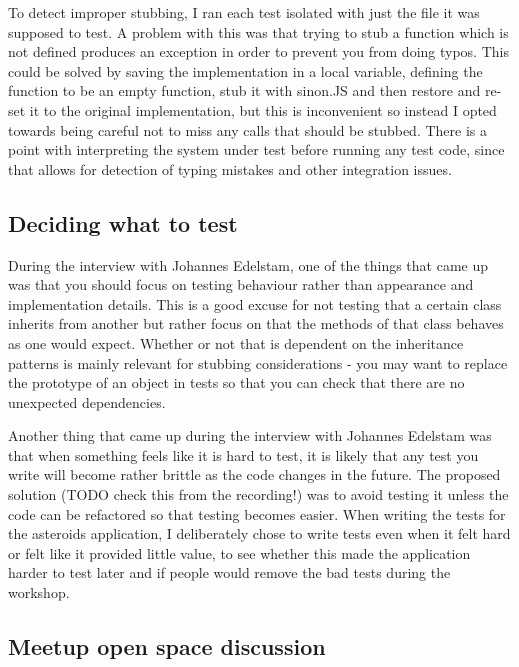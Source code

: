 \documentclass[11pt]{article}
\begin{document}
To detect improper stubbing, I ran each test isolated with just the file it was supposed to test. A problem with this was that trying to stub a function which is not defined produces an exception in order to prevent you from doing typos. This could be solved by saving the implementation in a local variable, defining the function to be an empty function, stub it with sinon.JS and then restore and re-set it to the original implementation, but this is inconvenient so instead I opted towards being careful not to miss any calls that should be stubbed. There is a point with interpreting the system under test before running any test code, since that allows for detection of typing mistakes and other integration issues.

\subsection{Deciding what to test}

During the interview with Johannes Edelstam, one of the things that came up was that you should focus on testing behaviour rather than appearance and implementation details. This is a good excuse for not testing that a certain class inherits from another but rather focus on that the methods of that class behaves as one would expect. Whether or not that is dependent on the inheritance patterns is mainly relevant for stubbing considerations - you may want to replace the prototype of an object in tests so that you can check that there are no unexpected dependencies.

Another thing that came up during the interview with Johannes Edelstam was that when something feels like it is hard to test, it is likely that any test you write will become rather brittle as the code changes in the future. The proposed solution (TODO check this from the recording!) was to avoid testing it unless the code can be refactored so that testing becomes easier. When writing the tests for the asteroids application, I deliberately chose to write tests even when it felt hard or felt like it provided little value, to see whether this made the application harder to test later and if people would remove the bad tests during the workshop.

\subsection{Meetup open space discussion}
\end{document}
